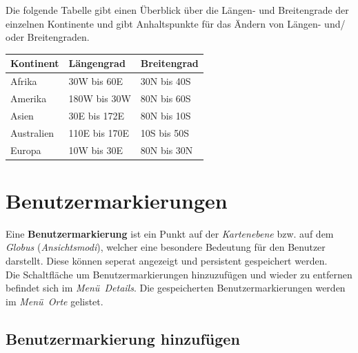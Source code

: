 \documentclass[10pt]{scrreprt}
\newcommand{\textref}[1]{\mbox{\raisebox{0.1ex}{\small$\rightarrow$ }\textit{#1}}}
\begin{document}
\vspace{5mm}
Die folgende Tabelle gibt einen Überblick über die Längen- und Breitengrade der einzelnen Kontinente und gibt Anhaltspunkte für das Ändern von Längen- und/ oder Breitengraden.

\vspace{3mm}
\begin{center}
\begin{tabular}{|>{\centering \arraybackslash}p{3cm}|>{\centering \arraybackslash}p{3cm}|>{\centering \arraybackslash}p{3cm}|}
\hline 
\rule[-1ex]{0pt}{4ex} \textbf{Kontinent} & \textbf{Längengrad} & \textbf{Breitengrad} \\ 
\hline
\hline
\rule[-1ex]{0pt}{4ex} Afrika & 30W bis 60E & 30N bis 40S\\
\hline
\rule[-1ex]{0pt}{4ex} Amerika & 180W bis 30W & 80N bis 60S \\
\hline
\rule[-1ex]{0pt}{4ex} Asien & 30E bis 172E & 80N bis 10S \\
\hline
\rule[-1ex]{0pt}{4ex} Australien & 110E bis 170E & 10S bis 50S \\
\hline
\rule[-1ex]{0pt}{4ex} Europa & 10W bis 30E & 80N bis 30N \\
\hline
\end{tabular}
\end{center}






\newpage
\section{Benutzermarkierungen} 
Eine \textbf{Benutzermarkierung} ist ein Punkt auf der \textref{Kartenebene} bzw. auf dem \textref{Globus} (\textref{Ansichtsmodi}), welcher eine besondere Bedeutung für den Benutzer darstellt. Diese können seperat angezeigt und persistent gespeichert werden.\\

Die Schaltfläche um Benutzermarkierungen hinzuzufügen und wieder zu entfernen befindet sich im \textref{Menü Details}. Die gespeicherten Benutzermarkierungen werden im \textref{Menü Orte} gelistet.


\vspace{3mm}
\subsection{Benutzermarkierung hinzufügen}  
\end{document}
